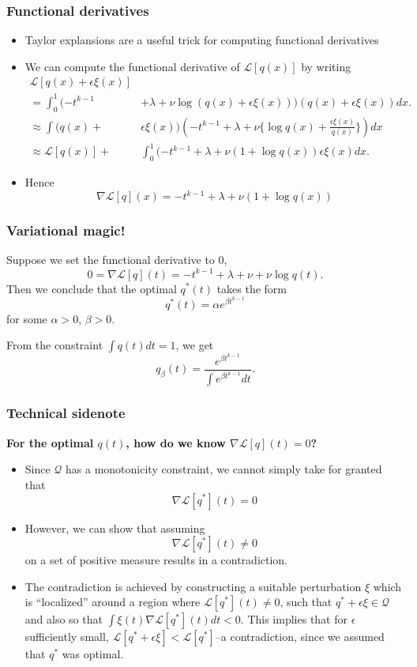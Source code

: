 \documentclass{beamer}
\begin{document}
\begin{frame}
\frametitle{Functional derivatives}
\begin{itemize}
\item Taylor explansions are a useful trick for computing functional derivatives
\item We can compute the functional derivative of $\mathcal{L}[q(x)]$ by writing
\begin{align*}
\mathcal{L}[q(x) + \epsilon \xi(x)] &
\\= \int_0^1 (-t^{k-1} &+ \lambda + \nu \log (q(x) + \epsilon \xi(x))) (q(x) + \epsilon \xi(x)) dx.
\\\approx  \int (q(x) + &\epsilon \xi(x)) (-t^{k-1} + \lambda + \nu \{\log q(x) + \frac{\epsilon \xi(x)}{q(x)}\}) dx
\\\approx  \mathcal{L}[q(x)] +& \int_0^1 (-t^{k-1} + \lambda + \nu (1 + \log q(x)) \epsilon\xi(x) dx.
\end{align*}
\item Hence
\[
\nabla \mathcal{L}[q](x) = -t^{k-1} + \lambda + \nu (1 + \log q(x))
\]
\end{itemize}
\end{frame}


\begin{frame}
\frametitle{Variational magic!}
Suppose we set the functional derivative to 0,
\[
0 = \nabla \mathcal{L}[q](t) = -t^{k-1} + \lambda + \nu + \nu \log q(t).
\]
Then we conclude that the optimal $q^*(t)$ takes the form
\[
q^*(t) = \alpha e^{\beta t^{k-1}}
\]
for some $\alpha > 0$, $\beta > 0$.

From the constraint $\int q(t)dt = 1$, we get
\[
q_\beta(t) = \frac{e^{\beta t^{k-1}}}{\int e^{\beta t^{k-1}} dt}.
\]
\end{frame}

\begin{frame}
\frametitle{Technical sidenote}
\textbf{For the optimal $q(t)$, how do we know $\nabla \mathcal{L}[q](t) = 0$?}

\begin{itemize}
\item Since $\mathcal{Q}$ has a monotonicity constraint, we cannot simply take for granted that
\[
\nabla \mathcal{L}[q^*](t) = 0
\]
\item However, we can show that assuming 
\[
\nabla \mathcal{L}[q^*](t) \neq 0
\]
on a set of positive measure results in a contradiction.
\item The contradiction is achieved by constructing a suitable
  perturbation $\xi$ which is ``localized'' around a region where
  $\mathcal{L}[q^*](t)\neq 0$, such that $q^* + \epsilon \xi \in
  \mathcal{Q}$ and also so that $\int \xi(t) \nabla
  \mathcal{L}[q^*](t) dt < 0$.  This implies that for $\epsilon$
  sufficiently small, $\mathcal{L}[q^* + \epsilon \xi] <
  \mathcal{L}[q^*]$--a contradiction, since we assumed that $q^*$ was
  optimal.
\end{itemize}
\end{frame}
\end{document}
